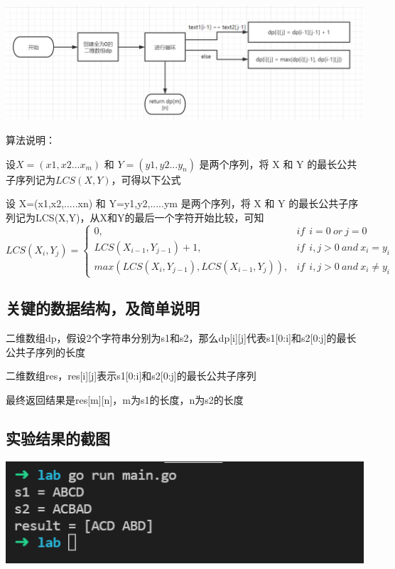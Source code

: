 \documentclass{ctexart}
\begin{document}
\includegraphics[width=\textwidth]{diagram.png}

算法说明：
\newline

设$X = (x1,x2...x_m)$ 和 $Y=(y1,y2...y_n)$ 是两个序列，将 X 和 Y 的最长公共子序列记为$LCS(X,Y)$，可得以下公式

设 X=(x1,x2,.....xn) 和 Y={y1,y2,.....ym} 是两个序列，将 X 和 Y 的最长公共子序列记为LCS(X,Y)，从X和Y的最后一个字符开始比较，可知
\[ 
LCS(X_i,Y_j)=
\begin{cases}
0, &  if \ \ i=0  \ or  \ j=0   \\
LCS(X_{i-1},Y_{j-1})+1, & if \ \ i,j>0  \ and  \ x_i=y_i   \\
max(LCS(X_i,Y_{j-1}),LCS(X_{i-1},Y_j)), & if \ \ i,j>0  \ and  \ x_i \neq y_i   
\end{cases}  
\]

\subsection{关键的数据结构，及简单说明}

二维数组dp，假设2个字符串分别为s1和s2，那么dp[i][j]代表s1[0:i]和s2[0:j]的最长公共子序列的长度

二维数组res，res[i][j]表示s1[0:i]和s2[0:j]的最长公共子序列

最终返回结果是res[m][n]，m为s1的长度，n为s2的长度

\subsection{实验结果的截图}
\includegraphics[width=\textwidth]{result.png}
\end{document}
